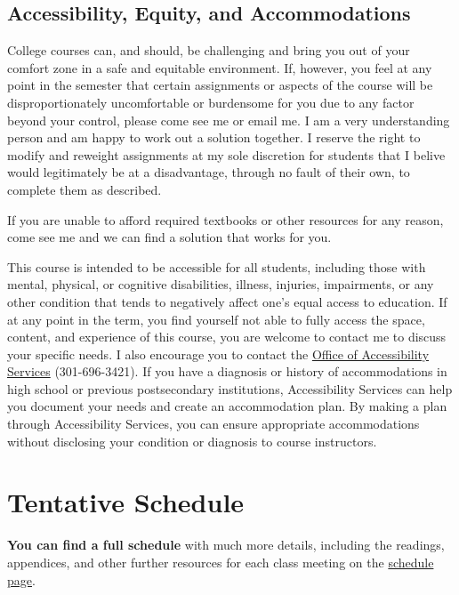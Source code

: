 \documentclass{article}
\begin{document}
\hypertarget{accessibility-equity-and-accommodations}{%
\subsection{Accessibility, Equity, and
Accommodations}\label{accessibility-equity-and-accommodations}}

College courses can, and should, be challenging and bring you out of
your comfort zone in a safe and equitable environment. If, however, you
feel at any point in the semester that certain assignments or aspects of
the course will be disproportionately uncomfortable or burdensome for
you due to any factor beyond your control, please come see me or email
me. I am a very understanding person and am happy to work out a solution
together. I reserve the right to modify and reweight assignments at my
sole discretion for students that I belive would legitimately be at a
disadvantage, through no fault of their own, to complete them as
described.

If you are unable to afford required textbooks or other resources for
any reason, come see me and we can find a solution that works for you.

This course is intended to be accessible for all students, including
those with mental, physical, or cognitive disabilities, illness,
injuries, impairments, or any other condition that tends to negatively
affect one's equal access to education. If at any point in the term, you
find yourself not able to fully access the space, content, and
experience of this course, you are welcome to contact me to discuss your
specific needs. I also encourage you to contact the
\href{https://www.hood.edu/academics/josephine-steiner-center-academic-achievement-retention/accessibility-services}{Office
of Accessibility Services} (301-696-3421). If you have a diagnosis or
history of accommodations in high school or previous postsecondary
institutions, Accessibility Services can help you document your needs
and create an accommodation plan. By making a plan through Accessibility
Services, you can ensure appropriate accommodations without disclosing
your condition or diagnosis to course instructors.

\hypertarget{tentative-schedule}{%
\section{Tentative Schedule}\label{tentative-schedule}}

\textbf{You can find a full schedule} with much more details, including
the readings, appendices, and other further resources for each class
meeting on the
\href{https://publics22.classes.ryansafner.com/schedule/}{schedule
page}.
\end{document}
